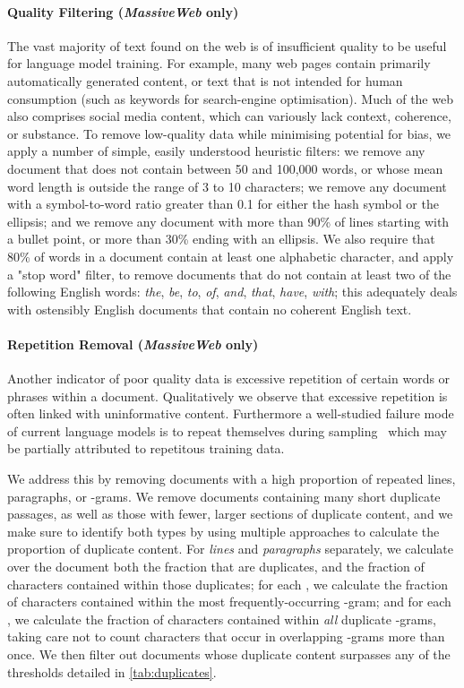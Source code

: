 \documentclass[11pt, a4paper, logo, internal, copyright, nonumbering]{deepmind}
\newcommand{\massiveweb}{\textit{MassiveWeb}\xspace}
\begin{document}
\paragraph{Quality Filtering (\massiveweb only)} The vast majority of text found on the web is of insufficient quality to be useful for language model training. For example, many web pages contain primarily automatically generated content, or text that is not intended for human consumption (such as keywords for search-engine optimisation). Much of the web also comprises social media content, which can variously lack context, coherence, or substance. To remove low-quality data while minimising potential for bias, we apply a number of simple, easily understood heuristic filters: we remove any document that does not contain between 50 and 100,000 words, or whose mean word length is outside the range of 3 to 10 characters; we remove any document with a symbol-to-word ratio greater than 0.1 for either the hash symbol or the ellipsis; and we remove any document with more than 90\% of lines starting with a bullet point, or more than 30\% ending with an ellipsis. We also require that 80\% of words in a document contain at least one alphabetic character, and apply a "stop word" filter, to remove documents that do not contain at least two of the following English words: \textit{the}, \textit{be}, \textit{to}, \textit{of}, \textit{and}, \textit{that}, \textit{have}, \textit{with}; this adequately deals with ostensibly English documents that contain no coherent English text.

\paragraph{Repetition Removal (\massiveweb only)} Another indicator of poor quality data is excessive repetition of certain words or phrases within a document. Qualitatively we observe that excessive repetition is often linked with uninformative content. Furthermore a well-studied failure mode of current language models is to repeat themselves during sampling~\citep{holtzman2019curious} which may be partially attributed to repetitous training data.

We address this by removing documents with a high proportion of repeated lines, paragraphs, or -grams. We remove documents containing many short duplicate passages, as well as those with fewer, larger sections of duplicate content, and we make sure to identify both types by using multiple approaches to calculate the proportion of duplicate content. For \textit{lines} and \textit{paragraphs} separately, we calculate over the document both the fraction that are duplicates, and the fraction of characters contained within those duplicates; for each , we calculate the fraction of characters contained within the most frequently-occurring -gram; and for each , we calculate the fraction of characters contained within \textit{all} duplicate -grams, taking care not to count characters that occur in overlapping -grams more than once. We then filter out documents whose duplicate content surpasses any of the thresholds detailed in \autoref{tab:duplicates}. 
\end{document}
